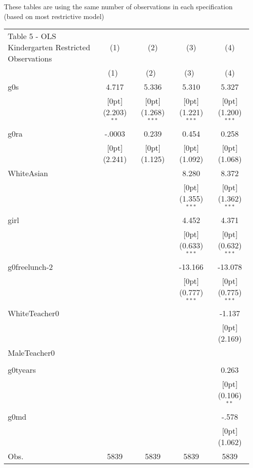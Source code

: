 \documentclass[a4paper,11pt]{article}
\begin{document}
\setlength\tabcolsep{1.75pt}

These tables are using the same number of observations in each specification (based on most  restrictive model) 


\begin{table}

\begin{tabular*}{\textwidth}{@{\extracolsep{\fill}}lcccc}				
	Table 5 - OLS Kindergarten Restricted Observations & \multicolumn{1}{c}{(1)} &	\multicolumn{1}{c}{(2)} &	\multicolumn{1}{c}{(3)} &	\multicolumn{1}{c}{(4)} \\
	\cline{2-5}				
	& \multicolumn{1}{c}{(1)\mbox{\ }} &	\multicolumn{1}{c}{(2)\mbox{\ }} &	\multicolumn{1}{c}{(3)\mbox{\ }} &	\multicolumn{1}{c}{(4)} \\
	\hline				
	g0s &	4.717 &	5.336 &	5.310 &	5.327 \\
	&	\raisebox{.7ex}[0pt]{\scriptsize (2.203)$^{**}$} &	\raisebox{.7ex}[0pt]{\scriptsize (1.268)$^{***}$} &	\raisebox{.7ex}[0pt]{\scriptsize (1.221)$^{***}$} &	\raisebox{.7ex}[0pt]{\scriptsize (1.200)$^{***}$} \\
	g0ra &	-.0003 &	0.239 &	0.454 &	0.258 \\
	&	\raisebox{.7ex}[0pt]{\scriptsize (2.241)} &	\raisebox{.7ex}[0pt]{\scriptsize (1.125)} &	\raisebox{.7ex}[0pt]{\scriptsize (1.092)} &	\raisebox{.7ex}[0pt]{\scriptsize (1.068)} \\
	WhiteAsian &	&	&	8.280 &	8.372 \\
	&	&	&	\raisebox{.7ex}[0pt]{\scriptsize (1.355)$^{***}$} &	\raisebox{.7ex}[0pt]{\scriptsize (1.362)$^{***}$} \\
	girl &	&	&	4.452 &	4.371 \\
	&	&	&	\raisebox{.7ex}[0pt]{\scriptsize (0.633)$^{***}$} &	\raisebox{.7ex}[0pt]{\scriptsize (0.632)$^{***}$} \\
	g0freelunch-2 &	&	&	-13.166 &	-13.078 \\
	&	&	&	\raisebox{.7ex}[0pt]{\scriptsize (0.777)$^{***}$} &	\raisebox{.7ex}[0pt]{\scriptsize (0.775)$^{***}$} \\
	WhiteTeacher0 &	&	&	&	-1.137 \\
	&	&	&	&	\raisebox{.7ex}[0pt]{\scriptsize (2.169)} \\
	MaleTeacher0 &	&	&	&	\\
	&	&	&	&	\\
	g0tyears &	&	&	&	0.263 \\
	&	&	&	&	\raisebox{.7ex}[0pt]{\scriptsize (0.106)$^{**}$} \\
	g0md &	&	&	&	-.578 \\
	&	&	&	&	\raisebox{.7ex}[0pt]{\scriptsize (1.062)} \\
	Obs. &	5839 &	5839 &	5839 &	5839 \\
	\hline\hline				
\end{tabular*}

\end{table}	
\end{document}
